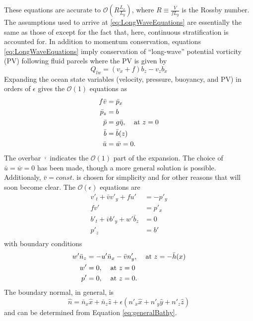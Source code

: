 \documentclass[12pt]{workjournal}
\begin{document}
These equations are accurate to $\mathcal{O}\left( R\frac{L_x}{L_y} \right)$, where $R \equiv \frac{V}{fL_y}$ is the Rossby number. The assumptions used to arrive at \eqref{eq:LongWaveEquations} are essentially the same as those of \citet{Stern1998} except for the fact that, here, continuous stratification is accounted for. In addition to momentum conservation, equations \eqref{eq:LongWaveEquations} imply conservation of ``long-wave'' potential vorticity (PV) following fluid parcels where the PV is given by  
 \begin{equation}
 Q_{lw} = (v_x + f)b_z - v_z b_x \label{eq:pv}
\end{equation}    
   Expanding the ocean state variables (velocity, pressure, buoyancy, and PV) in orders of $\epsilon$ gives the $\mathcal{O}(1)$ equations as
   \begin{subequations}
   \begin{align}
   f \bar{v} &= \bar{p}_x \\
   \bar{p}_z &= b \\
   \bar{p} &= g \bar{\eta}, \hspace{4mm} \text{at }z=0\\
   \bar{b} &= \bar{b}(z) \\
   \bar{u} &= \bar{w} = 0.
   \end{align} \label{eq:orderONE}
   \end{subequations} 
 The overbar $\bar{\cdot}$ indicates the $\mathcal{O}(1)$ part of the expansion. The choice of $\bar{u} = \bar{w} = 0$ has been made, though a more general solution is possible. Additionaly, $\bar{v} = const.$ is chosen for simplicity and for other reasons that will soon become clear. The $\mathcal{O}(\epsilon)$ equations are
   \begin{subequations}
   \begin{align}
   v'_t + \bar{v} v'_y  + f u' &= -p'_y \\
   f v' &= p'_x\\
   b'_t + \bar{v} b'_y  + w' \bar{b}_z &= 0 \\
   p'_z &= b' \\
   \end{align}\label{eq:OrderEpsilon}
   \end{subequations}   
  with boundary conditions
     \begin{subequations}
   \begin{align}
   w'\bar{n}_z &= -u' \bar{n}_x - \bar{v}n'_y, \hspace{4mm} \text{at } z=-\bar{h}(x) \\
   w' &= 0 , \hspace{4mm} \text{at } z=0 \\
   p' &= 0, \hspace{4mm} \text{at } z=0.
   \end{align}
   \end{subequations}    
   The boundary normal, in general, is 
   \begin{equation}
   \hat{n} = \bar{n}_x \hat{x}  + \bar{n}_z \hat{z} + \epsilon \left( n'_x \hat{x}  + n'_y \hat{y} + n'_z \hat{z}\right)
   \end{equation}
   and can be determined from Equation \eqref{eq:generalBathy}.
   
\end{document}
